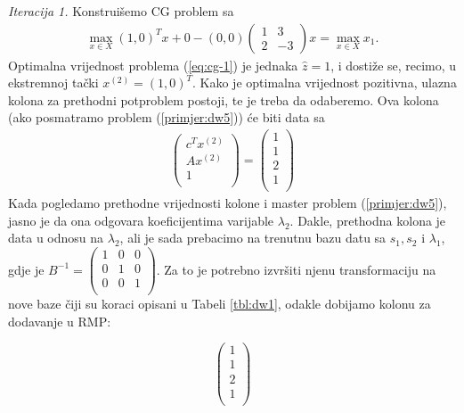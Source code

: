 \documentclass[a4paper, utf8, 11pt, colorlinks]{book}
\begin{document}
\emph{Iteracija 1.} 
Konstruišemo CG problem sa
\begin{align}\label{eq:cg-1}
	 \max_{x \in X} (1, 0)^T x + 0 - (0, 0) \left(\begin{array}{cc}
	 	1 & 3 \\
	 	2 & -3
	 \end{array}\right)  x = \max_{x \in X} x_1. 
\end{align} 
Optimalna vrijednost problema (\ref{eq:cg-1}) je jednaka $\hat{z}=1$, i dostiže se, recimo, u ekstremnoj tački $ x^{(2)}= (1, 0)^T.$ Kako je optimalna vrijednost pozitivna, ulazna kolona za prethodni potproblem postoji, te je treba da odaberemo. Ova kolona (ako posmatramo problem (\ref{primjer:dw5})) će biti data sa 
\begin{align}
     \begin{pmatrix}
     	    c^T  x^{(2)} \\
     	    A x^{(2)}  \\
     	    1     \\
     \end{pmatrix} = \begin{pmatrix}
               1 \\
               1  \\
               2  \\
               1\\
 \end{pmatrix}
\end{align}
Kada pogledamo prethodne vrijednosti kolone i master problem (\ref{primjer:dw5}), jasno je da ona odgovara koeficijentima varijable $\lambda_2$. Dakle, prethodna kolona je data u odnosu na $\lambda_2$, ali je sada prebacimo na trenutnu bazu datu sa $s_1, s_2$ i $\lambda_1$, gdje je $B^{-1} =  \begin{pmatrix}
	1 & 0 & 0 \\
	0 & 1 & 0  \\
	0 & 0 & 1  \\
\end{pmatrix}. $ %
Za to je potrebno izvršiti njenu transformaciju na nove baze čiji su koraci opisani u Tabeli \ref{tbl:dw1}, odakle dobijamo kolonu za dodavanje u RMP:
 
$$	\begin{pmatrix}
	       1 \\
	      1  \\
	      2  \\
	      1\\
	\end{pmatrix}
 $$
\end{document}

